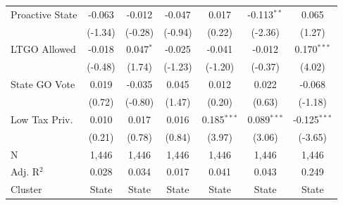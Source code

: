\begin{tabular*}{\textwidth}{@{\extracolsep{\fill}}lcccccc}
   Proactive State           & -0.063         & -0.012        & -0.047        & 0.017         & -0.113$^{**}$ & 0.065\\   
                             & (-1.34)       & (-0.28)      & (-0.94)      & (0.22)       & (-2.36)      & (1.27)\\   
   LTGO Allowed              & -0.018         & 0.047$^{*}$   & -0.025        & -0.041        & -0.012        & 0.170$^{***}$\\   
                             & (-0.48)       & (1.74)       & (-1.23)      & (-1.20)      & (-0.37)      & (4.02)\\   
   State GO Vote             & 0.019          & -0.035        & 0.045         & 0.012         & 0.022         & -0.068\\   
                             & (0.72)        & (-0.80)      & (1.47)       & (0.20)       & (0.63)       & (-1.18)\\   
   Low Tax Priv.             & 0.010          & 0.017         & 0.016         & 0.185$^{***}$ & 0.089$^{***}$ & -0.125$^{***}$\\   
                             & (0.21)        & (0.78)       & (0.84)       & (3.97)       & (3.06)       & (-3.65)\\   
   \hline
   N              & 1,446          & 1,446         & 1,446         & 1,446         & 1,446         & 1,446\\  
   Adj. R$^2$            & 0.028          & 0.034         & 0.017         & 0.041         & 0.043         & 0.249\\  
   Cluster              & State & State & State & State & State & State\\  
   \bottomrule
\end{tabular*}
\par\endgroup
